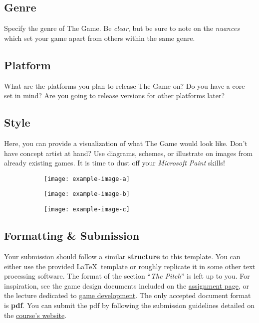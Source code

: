 \documentclass[a4paper,10pt,english]{article}
\begin{document}
\subsection*{Genre}
Specify the genre of The Game. Be \emph{clear}, but be sure to note on the \emph{nuances} which set your game apart from others within the same genre. 

\subsection*{Platform}
What are the platforms you plan to release The Game on? Do you have a core set in mind? Are you going to release versions for other platforms later?

\subsection*{Style}
Here, you can provide a visualization of what The Game would look like. Don't have concept artist at hand? Use diagrams, schemes, or illustrate on images from already existing games. It is time to dust off your \emph{Microsoft Paint} skills!

\begin{figure}[h]

\centering

\begin{subfigure}{0.29\linewidth}
\texttt{[image: example-image-a]}
\label{Fig:Style1A}
\end{subfigure}\hfill
%
\begin{subfigure}{0.29\linewidth}
\texttt{[image: example-image-b]}
\label{Fig:Style1B}
\end{subfigure}\hfill
%
\begin{subfigure}{0.29\linewidth}
\texttt{[image: example-image-c]}
\label{Fig:Style1C}
\end{subfigure}

\end{figure}

\subsection*{Formatting \& Submission}

Your submission should follow a similar \textbf{structure} to this template. You can either use the provided \LaTeX\ template or roughly replicate it in some other text processing software. The format of the section ``\emph{The Pitch}'' is left up to you. For inspiration, see the game design documents included on the \href{http://cphoto.fit.vutbr.cz/ludo/courses/izhv/exercises/e7/}{assignment page}, or the lecture dedicated to \href{http://cphoto.fit.vutbr.cz/ludo/courses/izhv/lectures/l12/}{game development}. The only accepted document format is \textbf{pdf}. You can submit the pdf by following the submission guidelines detailed on the \href{http://cphoto.fit.vutbr.cz/ludo/courses/izhv/exercises/sub/}{course's website}. 
\end{document}
